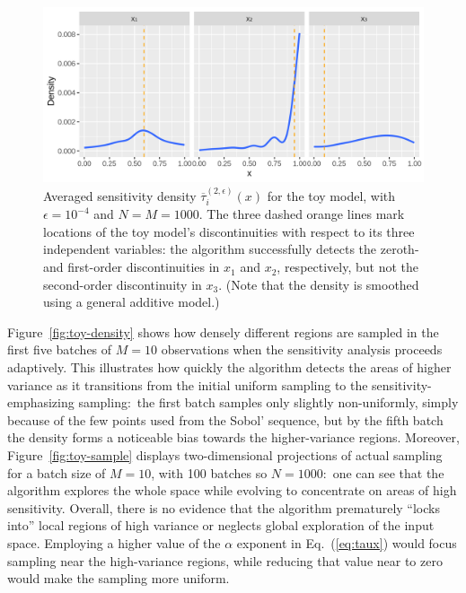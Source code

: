 \documentclass[12pt]{article}
\begin{document}
\begin{figure}
    \centering
    \includegraphics[width=1.00\linewidth]{figures/toy-taubar.png}
    \caption{Averaged sensitivity density $\overline{\tau}_i^{(2,\epsilon)}(x)$ for the toy model, with $\epsilon = 10^{-4}$ and $N = M = 1000$. The three dashed orange lines mark locations of the toy model's discontinuities with respect to its three independent variables: the algorithm successfully detects the zeroth- and first-order discontinuities in $x_1$ and $x_2$, respectively, but not the second-order discontinuity in $x_3$. (Note that the density is smoothed using a general additive model.)}
    \label{fig:toy-taubar}
\end{figure}

Figure~\ref{fig:toy-density} shows how densely different regions are sampled in the first five batches of $M = 10$ observations when the sensitivity analysis proceeds adaptively. This illustrates how quickly the algorithm detects the areas of higher variance as it transitions from the initial uniform sampling to the sensitivity-emphasizing sampling:\ the first batch samples only slightly non-uniformly, simply because of the few points used from the Sobol' sequence, but by the fifth batch the density forms a noticeable bias towards the higher-variance regions. Moreover, Figure~\ref{fig:toy-sample} displays two-dimensional projections of actual sampling for a batch size of $M = 10$, with 100 batches so $N = 1000$:\ one can see that the algorithm explores the whole space while evolving to concentrate on areas of high sensitivity. Overall, there is no evidence that the algorithm prematurely ``locks into'' local regions of high variance or neglects global exploration of the input space. Employing a higher value of the $\alpha$ exponent in Eq.~(\ref{eq:taux}) would focus sampling near the high-variance regions, while reducing that value near to zero would make the sampling more uniform.
\end{document}
